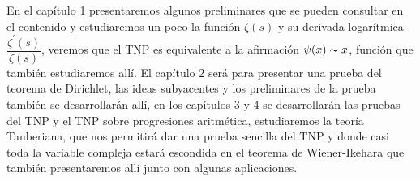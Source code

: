En el capítulo 1 presentaremos algunos preliminares que se pueden consultar en el contenido y estudiaremos un poco la función $\zeta(s)$ y su derivada logarítmica $\dfrac{\zeta^{\prime}(s)}{\zeta(s)}$, veremos que el TNP es equivalente a la afirmación $\psi(x)\thicksim x$, función que también estudiaremos allí. El capítulo 2 será para presentar una prueba del teorema de Dirichlet, las ideas subyacentes y los preliminares de la  prueba también se desarrollarán allí, en los capítulos 3 y 4 se desarrollarán las pruebas del TNP y el TNP sobre progresiones aritmética, estudiaremos la teoría Tauberiana, que nos permitirá dar una prueba sencilla del TNP y donde casi toda  la variable compleja estará escondida en el teorema de Wiener-Ikehara que también presentaremos allí junto con algunas aplicaciones.